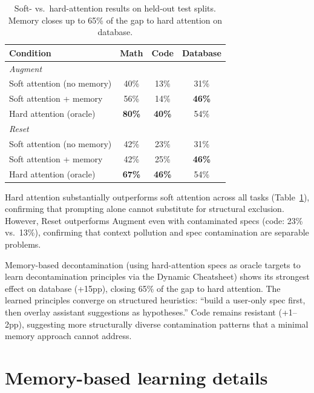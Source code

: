 \documentclass{article}
\begin{document}
\begin{table}[h]
\centering
\begin{tabular}{lccc}
\toprule
\textbf{Condition} & \textbf{Math} & \textbf{Code} & \textbf{Database} \\
\midrule
\multicolumn{4}{l}{\emph{Augment}} \\
\quad Soft attention (no memory) & 40\% & 13\% & 31\% \\
\quad Soft attention + memory & 56\% & 14\% & \textbf{46\%} \\
\quad Hard attention (oracle) & \textbf{80\%} & \textbf{40\%} & 54\% \\
\midrule
\multicolumn{4}{l}{\emph{Reset}} \\
\quad Soft attention (no memory) & 42\% & 23\% & 31\% \\
\quad Soft attention + memory & 42\% & 25\% & \textbf{46\%} \\
\quad Hard attention (oracle) & \textbf{67\%} & \textbf{46\%} & 54\% \\
\bottomrule
\end{tabular}
\caption{Soft- vs.\ hard-attention results on held-out test splits. Memory closes up to 65\% of the gap to hard attention on database.}
\label{tab:soft-attention}
\end{table}

Hard attention substantially outperforms soft attention across all tasks (Table~\ref{tab:soft-attention}), confirming that prompting alone cannot substitute for structural exclusion. However, Reset outperforms Augment even with contaminated specs (code: 23\% vs.\ 13\%), confirming that context pollution and spec contamination are separable problems.

Memory-based decontamination (using hard-attention specs as oracle targets to learn decontamination principles via the Dynamic Cheatsheet) shows its strongest effect on database (+15pp), closing 65\% of the gap to hard attention. The learned principles converge on structured heuristics: ``build a user-only spec first, then overlay assistant suggestions as hypotheses.'' Code remains resistant (+1--2pp), suggesting more structurally diverse contamination patterns that a minimal memory approach cannot address.

\section{Memory-based learning details}
\label{app:memory-details}
\end{document}
